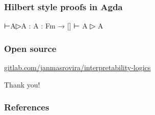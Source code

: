 \documentclass[xcolor={x11names}]{beamer}
\begin{document}
\begin{frame}[fragile]
  \frametitle{Hilbert style proofs in Agda}
\begin{semiverbatim}
⊢A▷A : {A : Fm} → [] ⊢ A ▷ A
\end{semiverbatim}
\end{frame}

\begin{frame}
  \frametitle{Open source}
  \centering
  \href{https://gitlab.com/janmasrovira/interpretability-logics}{gitlab.com/janmasrovira/interpretability-logics}
\end{frame}

\begin{frame}
  \centering \Huge Thank you!
\end{frame}

\begin{frame}[allowframebreaks]
  \frametitle{References}
  \nocite{MasRovira:2020:MastersThesis}
  \nocite{joosten2020overview}
  \printbibliography
\end{frame}
\end{document}
